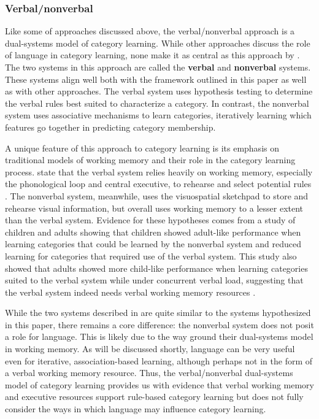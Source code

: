 \documentclass[../dissertation.tex]{subfiles}
\begin{document}
\subsubsection{Verbal/nonverbal}
	Like some of approaches discussed above, the verbal/nonverbal approach is a dual-systems model of category learning. While other approaches discuss the role of language in category learning, none make it as central as this approach by \citet{Minda2010}. The two systems in this approach are called the \textbf{verbal} and \textbf{nonverbal} systems. These systems align well both with the framework outlined in this paper as well as with other approaches. The verbal system uses hypothesis testing to determine the verbal rules best suited to characterize a category. In contrast, the nonverbal system uses associative mechanisms to learn categories, iteratively learning which features go together in predicting category membership. \par
	A unique feature of this approach to category learning is its emphasis on traditional models of working memory and their role in the category learning process. \citet{Minda2010} state that the verbal system relies heavily on working memory, especially the phonological loop and central executive, to rehearse and select potential rules \citep{Baddeley1974}. The nonverbal system, meanwhile, uses the visuospatial sketchpad to store and rehearse visual information, but overall uses working memory to a lesser extent than the verbal system. Evidence for these hypotheses comes from a study of children and adults showing that children showed adult-like performance when learning categories that could be learned by the nonverbal system and reduced learning for categories that required use of the verbal system. This study also showed that adults showed more child-like performance when learning categories suited to the verbal system while under concurrent verbal load, suggesting that the verbal system indeed needs verbal working memory resources \citep{Minda2008}. \par
	While the two systems described in \citet{Minda2010} are quite similar to the systems hypothesized in this paper, there remains a core difference: the nonverbal system does not posit a role for language. This is likely due to the way \citet{Minda2010} ground their dual-systems model in working memory. As will be discussed shortly, language can be very useful even for iterative, association-based learning, although perhaps not in the form of a verbal working memory resource. Thus, the verbal/nonverbal dual-systems model of category learning provides us with evidence that verbal working memory and executive resources support rule-based category learning but does not fully consider the ways in which language may influence category learning. 
\end{document}
